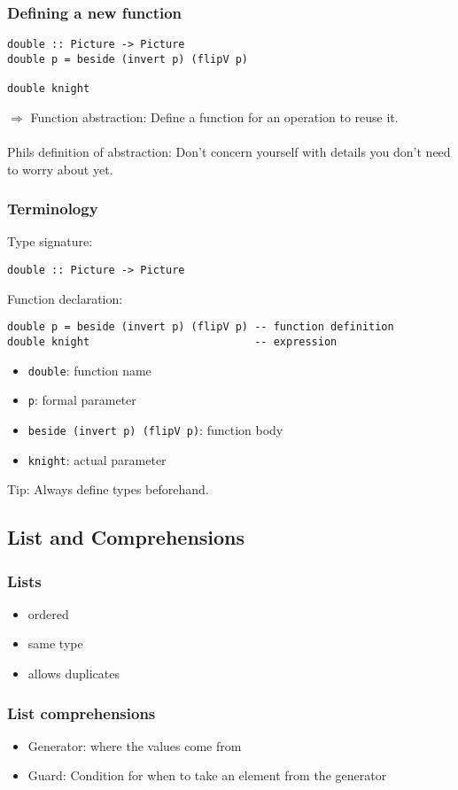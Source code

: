 \documentclass{article}
\begin{document}
\subsubsection{Defining a new function}
\begin{verbatim}
double :: Picture -> Picture
double p = beside (invert p) (flipV p)

double knight
\end{verbatim}
$\Rightarrow$ Function abstraction: Define a function for an operation to reuse it.\\\\
Phils definition of abstraction: Don't concern yourself with details you don't need to worry about yet.
\subsubsection{Terminology}
Type signature:
\begin{verbatim}
double :: Picture -> Picture
\end{verbatim}
Function declaration:
\begin{verbatim}
double p = beside (invert p) (flipV p) -- function definition
double knight                          -- expression
\end{verbatim}
\begin{itemize}
    \item \texttt{double}: function name
    \item \texttt{p}: formal parameter
    \item \texttt{beside (invert p) (flipV p)}: function body
    \item \texttt{knight}: actual parameter
\end{itemize}
Tip: Always define types beforehand.
\subsection{List and Comprehensions}
\subsubsection{Lists}
\begin{itemize}
    \item ordered
    \item same type
    \item allows duplicates
\end{itemize}
\subsubsection{List comprehensions}
\begin{itemize}
    \item Generator: where the values come from
    \item Guard: Condition for when to take an element from the generator
\end{itemize}
\end{document}

